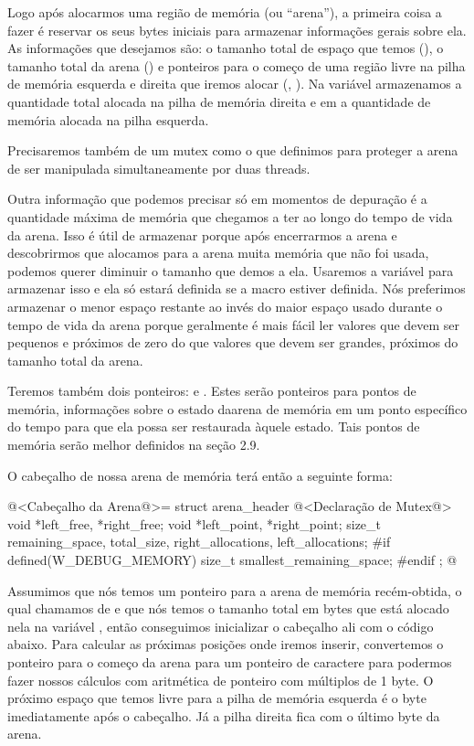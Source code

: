 Logo após alocarmos uma região de memória (ou ``arena''), a primeira
coisa a fazer é reservar os seus bytes iniciais para armazenar
informações gerais sobre ela. As informações que desejamos são: o
tamanho total de espaço que temos (), o
tamanho total da arena () e ponteiros para o
começo de uma região livre na pilha de memória esquerda e direita que
iremos alocar (, ). Na
variável  armazenamos a quantidade
total alocada na pilha de memória direita e
em  a quantidade de memória alocada na
pilha esquerda.

Precisaremos também de um mutex como o que definimos para proteger a
arena de ser manipulada simultaneamente por duas threads.

Outra informação que podemos precisar só em momentos de depuração é a
quantidade máxima de memória que chegamos a ter ao longo do tempo de
vida da arena. Isso é útil de armazenar porque após encerrarmos a
arena e descobrirmos que alocamos para a arena muita memória que não
foi usada, podemos querer diminuir o tamanho que demos a ela. Usaremos
a variável  para armazenar isso
e ela só estará definida se a macro 
estiver definida. Nós preferimos armazenar o menor espaço restante ao
invés do maior espaço usado durante o tempo de vida da arena porque
geralmente é mais fácil ler valores que devem ser pequenos e próximos
de zero do que valores que devem ser grandes, próximos do tamanho
total da arena.

Teremos também dois ponteiros: 
e . Estes serão ponteiros para pontos de
memória, informações sobre o estado daarena de memória em um ponto
específico do tempo para que ela possa ser restaurada àquele
estado. Tais pontos de memória serão melhor definidos na seção 2.9.

O cabeçalho de nossa arena de memória terá então a seguinte forma:

\iniciocodigo
@<Cabeçalho da Arena@>=
struct arena_header{
  @<Declaração de Mutex@>
  void *left_free, *right_free;
  void *left_point, *right_point;
  size_t remaining_space, total_size, right_allocations, left_allocations;
#if defined(W_DEBUG_MEMORY)
  size_t smallest_remaining_space;
#endif
};
@
\fimcodigo

Assumimos que nós temos um ponteiro para a arena de memória
recém-obtida, o qual chamamos de  e que nós temos o
tamanho total em bytes que está alocado nela na
variável , então conseguimos inicializar o cabeçalho ali
com o código abaixo. Para calcular as próximas posições onde iremos
inserir, convertemos o ponteiro para o começo da arena para um
ponteiro de caractere para podermos fazer nossos cálculos com
aritmética de ponteiro com múltiplos de 1 byte. O próximo espaço que
temos livre para a pilha de memória esquerda é o byte imediatamente
após o cabeçalho. Já a pilha direita fica com o último byte da arena.

